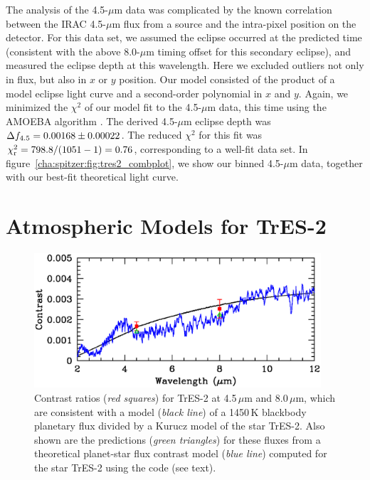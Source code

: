 The analysis of the 4.5-$\mu$m data was complicated by the known correlation between the IRAC 4.5-$\mu$m flux from a source and the intra-pixel position on the detector.
For this data set, we assumed the eclipse occurred at the predicted time (consistent with the above 8.0-$\mu$m timing offset for this secondary eclipse), and measured the eclipse depth at this wavelength. 
Here we excluded outliers not only in flux, but also in $x$ or $y$ position. 
Our model consisted of the product of a model eclipse light curve 
and a second-order polynomial in $x$ and $y$.
Again, we minimized the $\chi^{2}$ of our model fit to the 4.5-$\mu$m data, this time using the AMOEBA algorithm \citep{Press_Teukolsky_Vetterling:1992a}. 
The derived 4.5-$\mu$m eclipse depth was \mbox{$\Delta f_{\rm {4.5}} = 0.00168 \pm 0.00022$}. 
The reduced $\chi^{2}$ for this fit was \mbox{$\chi_{\rm r}^{2} = 798.8/(1051-1)=0.76$}, corresponding to a well-fit data set.
In figure~\ref{cha:spitzer:fig:tres2_combplot}, we show our binned 4.5-$\mu$m data, together with our best-fit theoretical light curve.

\section{Atmospheric Models for TrES-2}
\label{cha:spitzer:sec:atm}

\begin{figure}
\begin{center}
\includegraphics[width=0.95\textwidth]{6_f2}
\caption[%
Near-infrared contrast ratios for TrES-2]{%
Contrast ratios ({\it red squares}) for TrES-2 at 4.5\,$\mu$m and 8.0\,$\mu$m, which are consistent with a model ({\it black line}) of a 1450\,K blackbody planetary flux divided by a Kurucz model of the star TrES-2. Also shown are the predictions ({\it green triangles}) for these fluxes from a theoretical planet-star flux contrast model ({\it blue line}) computed for the star TrES-2 using the \citet{Seager_Richardson_Hansen:apj:2005a} code (see text).%
}
\label{cha:spitzer:fig:tres2models}
\end{center}
\end{figure}

